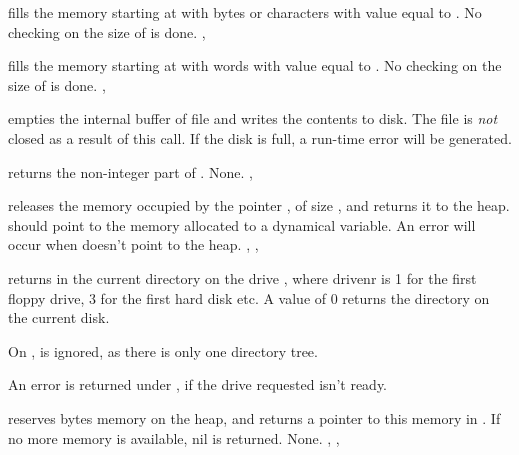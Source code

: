 \documentclass{report}
\begin{document}
{ fills the memory starting at  with  bytes
or characters with value equal to .
}
{No checking on the size of  is done.}
{, }



{ fills the memory starting at  with  words
with value equal to .
}
{No checking on the size of  is done.}
{, }



{ empties the internal buffer of file  and writes the
contents to disk. The file is \textit{not} closed as a result of this call.}
{If the disk is full, a run-time error will be generated.}
{}



{ returns the non-integer part of .}
{None.}
{, }



{ releases the memory occupied by the pointer , of size
, and returns it to the heap.  should point to the memory
allocated to a dynamical variable.}
{An error will occur when  doesn't point to the heap.}
{, , }



{ returns in  the current directory on the drive
, where {drivenr} is 1 for the first floppy drive, 3 for the
first hard disk etc. A value of 0 returns the directory on the current disk.

On \linux,  is ignored, as there is only one directory tree.}
{An error is returned under \dos, if the drive requested isn't ready.}
{}



{ reserves  bytes memory on the heap, and returns a
pointer to this memory in . If no more memory is available, nil is
returned.}
{None.}
{, , }
\end{document}
